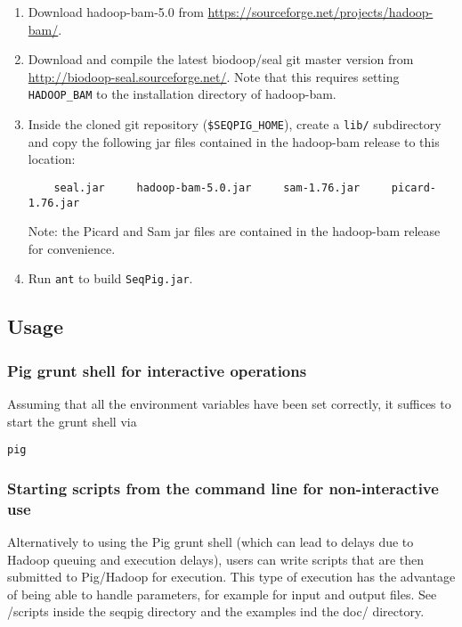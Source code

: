 \documentclass[a4paper,10pt,bibtotoc,abstracton,oneside,noindent,DIV15]{scrartcl}
\begin{document}
\begin{enumerate}
\item Download hadoop-bam-5.0 from \url{https://sourceforge.net/projects/hadoop-bam/}.

\item Download and compile the latest biodoop/seal git master version from
 \url{http://biodoop-seal.sourceforge.net/}. Note that this requires
 setting {\tt HADOOP\_BAM} to the installation directory of hadoop-bam.

\item Inside the cloned git repository ({\tt \$SEQPIG\_HOME}), create a
{\tt lib/} subdirectory and copy the following jar files contained in the
hadoop-bam release to this location:
%
\begin{lstlisting} 
    seal.jar     hadoop-bam-5.0.jar     sam-1.76.jar     picard-1.76.jar
\end{lstlisting}
%
Note: the Picard and Sam jar files are contained in the hadoop-bam release
for convenience.

\item Run {\tt ant} to build {\tt SeqPig.jar}.
\end{enumerate}

\subsection{Usage}

\subsubsection{Pig grunt shell for interactive operations}
Assuming that all the environment variables have been set correctly, it suffices
to start the grunt shell via
%
\begin{lstlisting}
pig
\end{lstlisting}
%
\subsubsection{Starting scripts from the command line for non-interactive use}
Alternatively to using the Pig grunt shell (which can lead to delays due to
Hadoop queuing and execution delays), users can write scripts that are
then submitted to Pig/Hadoop for execution. This type of execution has
the advantage of being able to handle parameters, for example for input
and output files. See /scripts inside the seqpig directory and the
examples ind the doc/ directory.
\end{document}

